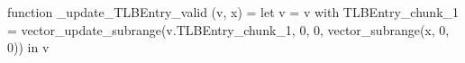 function _update_TLBEntry_valid (v, x) = let v = { v with TLBEntry_chunk_1 = vector_update_subrange(v.TLBEntry_chunk_1, 0, 0, vector_subrange(x, 0, 0)) } in v
